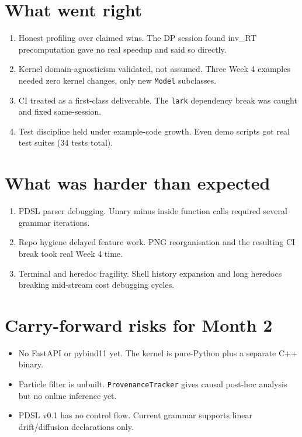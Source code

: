 \documentclass[11pt]{article}
\begin{document}
\section*{What went right}
\begin{enumerate}[leftmargin=*]
  \item Honest profiling over claimed wins. The DP session found
    inv\_RT precomputation gave no real speedup and said so directly.
  \item Kernel domain-agnosticism validated, not assumed. Three Week 4
    examples needed zero kernel changes, only new \texttt{Model}
    subclasses.
  \item CI treated as a first-class deliverable. The \texttt{lark}
    dependency break was caught and fixed same-session.
  \item Test discipline held under example-code growth. Even demo
    scripts got real test suites (34 tests total).
\end{enumerate}

\section*{What was harder than expected}
\begin{enumerate}[leftmargin=*]
  \item PDSL parser debugging. Unary minus inside function calls
    required several grammar iterations.
  \item Repo hygiene delayed feature work. PNG reorganisation and the
    resulting CI break took real Week 4 time.
  \item Terminal and heredoc fragility. Shell history expansion and
    long heredocs breaking mid-stream cost debugging cycles.
\end{enumerate}

\section*{Carry-forward risks for Month 2}
\begin{itemize}[leftmargin=*]
  \item No FastAPI or pybind11 yet. The kernel is pure-Python plus a
    separate C++ binary.
  \item Particle filter is unbuilt. \texttt{ProvenanceTracker} gives
    causal post-hoc analysis but no online inference yet.
  \item PDSL v0.1 has no control flow. Current grammar supports linear
    drift/diffusion declarations only.
\end{itemize}
\end{document}
